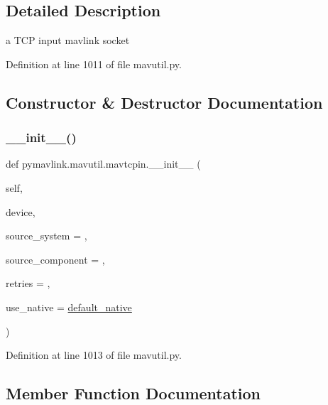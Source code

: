 \subsection{Detailed Description}
\begin{DoxyVerb}a TCP input mavlink socket\end{DoxyVerb}
 

Definition at line 1011 of file mavutil.\+py.



\subsection{Constructor \& Destructor Documentation}
\mbox{\label{classpymavlink_1_1mavutil_1_1mavtcpin_a9fefff3e5fa24dd0ee667699c6a67b57}} 
\subsubsection{\texorpdfstring{\_\_init\_\_()}{\_\_init\_\_()}}
{\footnotesize\ttfamily def pymavlink.\+mavutil.\+mavtcpin.\+\_\+\+\_\+init\+\_\+\+\_\+ (\begin{DoxyParamCaption}\item[{}]{self,  }\item[{}]{device,  }\item[{}]{source\+\_\+system = {},  }\item[{}]{source\+\_\+component = {},  }\item[{}]{retries = {},  }\item[{}]{use\+\_\+native = {\ttfamily \mbox{\hyperlink{namespacepymavlink_1_1mavutil_a21ce9da7b698a7bc21c44b9f77341b62}{default\+\_\+native}}} }\end{DoxyParamCaption})}



Definition at line 1013 of file mavutil.\+py.



\subsection{Member Function Documentation}
\mbox{\label{classpymavlink_1_1mavutil_1_1mavtcpin_a729201fdb2c0c2f864f742c88879eeec}} 

